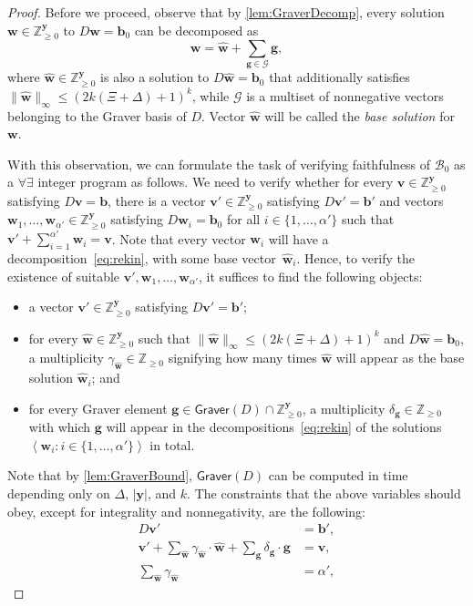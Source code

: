 \documentclass{article}
\renewcommand{\leq}{\leqslant}
\renewcommand{\geq}{\geqslant}
\newcommand{\Bb}{\mathcal{B}}
\newcommand{\Z}{\mathbb{Z}}
\newcommand{\Zn}{\Z_{\geq 0}}
\newcommand{\tup}[1]{{\mathbf{#1}}}
\newcommand{\ww}{\tup w}
\newcommand{\whww}{{\widehat{\ww}}}
\newcommand{\yy}{\tup y}
\newcommand{\bb}{\tup b}
\renewcommand{\gg}{\tup g}
\newcommand{\myvv}{\tup v} %
\newcommand{\Graver}{\mathsf{Graver}}
\newcommand{\mset}[1]{\left\langle #1\right\rangle}
\newcommand{\Gg}{\mathcal{G}}
\begin{document}
\begin{proof}
Before we proceed, observe that by \cref{lem:GraverDecomp}, every solution $\ww\in \Zn^{\yy}$ to $D\ww=\bb_0$ can be decomposed as
\begin{equation}\label{eq:rekin}
    \ww=\whww+\sum_{\gg\in \Gg} \gg,
\end{equation}
where $\whww\in \Zn^{\yy}$ is also a solution to $D\whww=\bb_0$ that additionally satisfies $\|\whww\|_\infty\leq (2k(\Xi+\Delta)+1)^{k}$, while $\Gg$ is a multiset of nonnegative vectors belonging to the Graver basis of $D$. Vector $\whww$ will be called the {\em{base solution}} for $\ww$.

With this observation, we can formulate the task of verifying faithfulness of $\Bb_0$ as a $\forall\exists$ integer program as follows. We need to verify whether for every $\myvv\in \Zn^\yy$ satisfying $D\myvv=\bb$, there is a vector $\myvv'\in \Zn^\yy$ satisfying $D\myvv'=\bb'$ and vectors $\ww_1,\ldots,\ww_{\alpha'}\in \Zn^\yy$ satisfying $D\ww_i=\bb_0$ for all $i\in \{1,\ldots,\alpha'\}$ such that $\myvv'+\sum_{i=1}^{\alpha'}\ww_i=\myvv$. Note that every vector $\ww_i$ will have a decomposition~\cref{eq:rekin}, with some base vector~$\whww_i$. Hence, to verify the existence of suitable $\myvv',\ww_1,\ldots,\ww_{\alpha'}$, it suffices to find the following objects:
\begin{itemize}[nosep]
 \item a vector $\myvv'\in \Zn^\yy$ satisfying $D\myvv'=\bb'$;
 \item for every $\whww\in \Zn^\yy$ such that $\|\whww\|_\infty\leq (2k(\Xi+\Delta)+1)^{k}$ and $D\whww=\bb_0$, a multiplicity $\gamma_{\whww}\in \Zn$ signifying how many times $\whww$ will appear as the base solution $\whww_i$; and
 \item for every Graver element $\gg\in \Graver(D)\cap \Zn^{\yy}$, a multiplicity $\delta_\gg\in \Zn$ with which $\gg$ will appear in the decompositions~\cref{eq:rekin} of the solutions $\mset{\ww_i\colon i\in \{1,\ldots,\alpha'\}}$ in total.
\end{itemize}
Note that by \cref{lem:GraverBound}, $\Graver(D)$ can be computed in time depending only on $\Delta$, $|\yy|$, and $k$.
The constraints that the above variables should obey, except for integrality and nonnegativity, are the following:
\begin{align*}
    D\myvv' & = \bb', \\
    \myvv' + \sum_{\whww} \gamma_{\whww}\cdot \whww + \sum_{\gg} \delta_\gg\cdot \gg & = \myvv,\\
    \sum_{\whww} \gamma_{\whww} & = \alpha' ,

\end{align*}
\end{proof}
\end{document}
